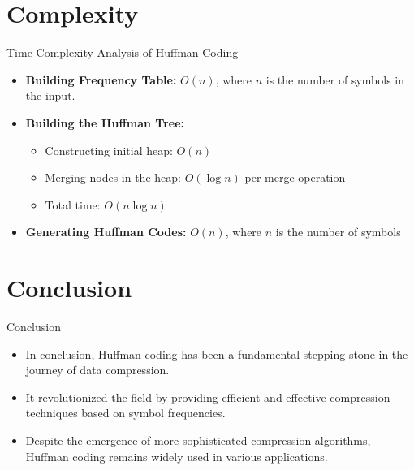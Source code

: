 \documentclass{beamer}
\begin{document}
	
	
	
	
	\section{Complexity}
	
	\begin{frame}{Time Complexity Analysis of Huffman Coding}
		\begin{itemize}
			\item \textbf{Building Frequency Table:} \(O(n)\), where \(n\) is the number of symbols in the input.
			\item \textbf{Building the Huffman Tree:} 
			\begin{itemize}
				\item Constructing initial heap: \(O(n)\)
				\item Merging nodes in the heap: \(O(\log n)\) per merge operation
				\item Total time: \(O(n \log n)\)
			\end{itemize}
			\item \textbf{Generating Huffman Codes:} \(O(n)\), where \(n\) is the number of symbols
		\end{itemize}
		
		\vspace{0.5cm}
		
	\end{frame}
	
	
	
	
	
	\section{Conclusion}
	
	
	\begin{frame}{Conclusion}
		\begin{itemize}
			\item In conclusion, Huffman coding has been a fundamental stepping stone in the journey of data compression.
			\item It revolutionized the field by providing efficient and effective compression techniques based on symbol frequencies.
			\item Despite the emergence of more sophisticated compression algorithms, Huffman coding remains widely used in various applications.
		\end{itemize}
	\end{frame}
	
\end{document}
